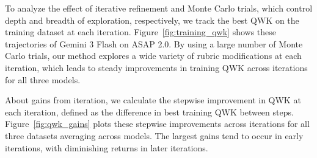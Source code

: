 \documentclass[11pt]{article}
\begin{document}
\begin{table}[t]
\centering
{}
\caption{Effect of training sample size ($N$) on test QWK. Baseline uses the human expert rubric without refinement. Bold indicates the best and underline indicates the second-best QWK among training sizes for each model.}
\label{tab:train_size}
\end{table}
To analyze the effect of iterative refinement and Monte Carlo trials, which control depth and breadth of exploration, respectively, we track the best QWK on the training dataset at each iteration. Figure~\ref{fig:training_qwk} shows these trajectories of Gemini 3 Flash on ASAP 2.0. By using a large number of Monte Carlo trials, our method explores a wide variety of rubric modifications at each iteration, which leads to steady improvements in training QWK across iterations for all three models. 

About gains from iteration, we calculate the stepwise improvement in QWK at each iteration, defined as the difference in best training QWK between steps. Figure~\ref{fig:qwk_gains} plots these stepwise improvements across iterations for all three datasets averaging across models. The largest gains tend to occur in early iterations, with diminishing returns in later iterations.
\end{document}

